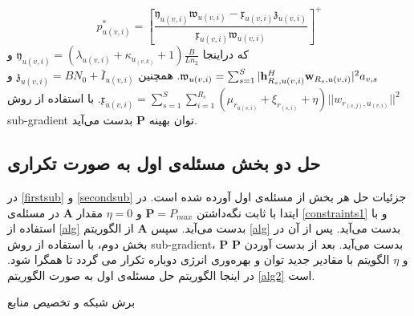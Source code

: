 \begin{equation}
	p_{u(v,i)}^{*} = [\frac{\mathfrak{y}_{u(v,i)}\mathfrak{w}_{u(v,i)}-\mathfrak{x}_{u(v,i)}\mathfrak{z}_{u(v,i)}}{\mathfrak{x}_{u(v,i)}\mathfrak{w}_{u(v,i)} }]^+
\end{equation}
که دراینجا 
 $\mathfrak{y}_{u(v,i)}= (\lambda_{u(v,i)}+\kappa_{u_{(v,k)}}+1)\frac{B}{Ln_2}$
 و
$\mathfrak{w}_{u(v,i)} = \sum_{s=1}^{S}|\bold{h}_{R_s,u(v,i)}^H \bold{w}_{R_s,u(v,i)}|^2 a_{v,s}$. 
همچنین
$\mathfrak{z}_{u(v,i)} = BN_0 + \bar{I}_{u(v,i)}$ و $\mathfrak{x}_{u(v,i)} = \sum\limits_{s=1}^{S} \sum\limits_{i=1}^{R_s} ( \mu_{r_{u(s,i)}} + \xi_{r_{(s,i)}}+\eta)||w_{r_{(s,j)},u_{(v,i)}}||^2$.
با استفاده از روش sub-gradient توان بهینه $\boldsymbol{P}$ بدست می‌آید\cite{mimoCran}.
\subsection{حل دو بخش مسئله‌ی اول به صورت تکراری}
در \eqref{firstsub} و \eqref{secondsub}
جزئیات حل هر بخش از مسئله‌ی اول آورده شده است.
در ایتدا با ثابت نگه‌داشتن $\boldsymbol{P} = P_{max}$
و $\eta = 0$
مقدار $\boldsymbol{A}$
در مسئله‌ی \eqref{constraints1}
و با استفاده از \eqref{alg}
بدست می‌آید. 
سپس $\boldsymbol{A}$ از الگوریتم \ref{alg} بدست می‌آید. پس از آن در بخش دوم، با استفاده از روش sub-gradient، $\boldsymbol{P}$ 
بدست می‌آید. 
بعد از بدست آوردن $\boldsymbol{P}$ و $\eta$ الگویتم با مقادیر جدید توان و بهره‌وری انرژی دوباره تکرار می گردد تا همگرا شود.
در اینجا الگوریتم حل مسئله‌ی اول به صورت الگوریتم \eqref{alg2} است.

\begin{algorithm}
	\caption{برش شبکه و تخصیص منابع}\label{alg2}
	\begin{latin}
	\begin{algorithmic}[1]
		\Else
		\EndIf
		\EndFor
	\end{algorithmic}
	\end{latin}
\end{algorithm}
